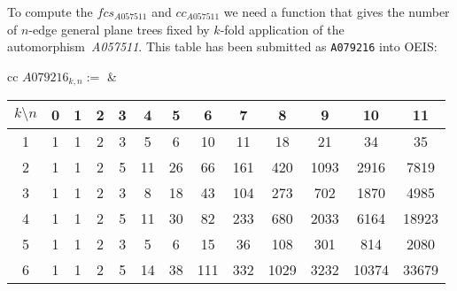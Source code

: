 \documentclass[11pt]{article} %
\newcommand{\autname}[1]{{\it *#1}}
\newcommand{\automorphism}[1]{automorphism~\autname{#1}}
\newcommand{\EISseq}[1]{{\tt #1}}
\begin{document}
To compute the $fcs_{A057511}$ and $cc_{A057511}$ we need a function
that gives the number of $n$-edge general plane trees fixed by
$k$-fold application of the \automorphism{A057511}.
This table has been submitted as \EISseq{A079216} into OEIS:
\begin{center}
\begin{tabular}{cc}
$A079216_{k,n} := $ &
\begin{tabular}{c|cccccccccccc}
$k \setminus n$ &
        0 & 1 & 2 & 3 &  4 &  5 &   6 &   7 &    8 &    9 &    10 &    11  \\
\hline
1     & 1 & 1 & 2 & 3 &  5 &  6 &  10 &  11 &   18 &   21 &    34 &    35 \\ %
2     & 1 & 1 & 2 & 5 & 11 & 26 &  66 & 161 &  420 & 1093 &  2916 &  7819 \\ %
3     & 1 & 1 & 2 & 3 &  8 & 18 &  43 & 104 &  273 &  702 &  1870 &  4985 \\ %
4     & 1 & 1 & 2 & 5 & 11 & 30 &  82 & 233 &  680 & 2033 &  6164 & 18923 \\ %
5     & 1 & 1 & 2 & 3 &  5 &  6 &  15 &  36 &  108 &  301 &   814 &  2080 \\ %
6     & 1 & 1 & 2 & 5 & 14 & 38 & 111 & 332 & 1029 & 3232 & 10374 & 33679 \\ %
\end{tabular}
\\
\end{tabular}
\end{center}

\
\end{document}
